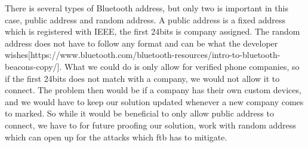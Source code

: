 There is several types of Bluetooth address, but only two is important in this case, public address and random address. A public address is a fixed address which is registered with IEEE, the first 24bits is company assigned. The random address does not have to follow any format and can be what the developer wishes[https://www.bluetooth.com/bluetooth-resources/intro-to-bluetooth-beacons-copy/]. What we could do is only allow for verified phone companies, so if the first 24bits does not match with a company, we would not allow it to connect. The problem then would be if a company has their own custom devices, and we would have to keep our solution updated whenever a new company comes to marked. So while it would be beneficial to only allow public address to connect, we have to for future proofing our solution, work with random address which can open up for the attacks which \gls{ftb} has to mitigate.